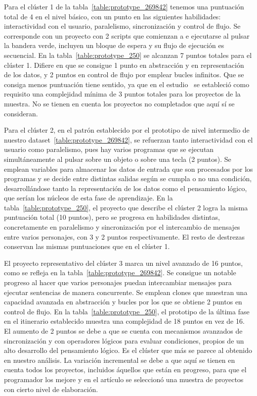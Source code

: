 \documentclass[a4paper, 12pt]{book}
\begin{document}
Para el clúster 1 de la tabla~\ref{table:prototype_269842} tenemos una puntuación total de 4 en el nivel básico, con un punto en las siguientes habilidades: interactividad con el usuario, paralelismo, sincronización y control de flujo. Se corresponde con un proyecto con 2 scripts que comienzan a e ejecutarse al pulsar la bandera verde, incluyen un bloque de espera y su flujo de ejecución es secuencial. En la tabla~\ref{table:prototype_250} se alcanzan 7 puntos totales para el clúster 1. Difiere en que se consigue 1 punto en abstracción y en representación de los datos, y 2 puntos en control de flujo por emplear bucles infinitos. Que se consiga menos puntuación tiene sentido, ya que en el estudio~\cite{moreno17:_paths} se estableció como requisito una complejidad mínima de 3 puntos totales para los proyectos de la muestra. No se tienen en cuenta los proyectos no completados que aquí sí se consideran.

Para el clúster 2, en el patrón establecido por el prototipo de nivel intermedio de nuestro dataset~\ref{table:prototype_269842}, se refuerzan tanto interactividad con el usuario como paralelismo, pues hay varios programas que se ejecutan simultáneamente al pulsar sobre un objeto o sobre una tecla (2 puntos). Se emplean variables para almacenar los datos de entrada que son procesados por los programas y se decide entre distintas salidas según se cumpla o no una condición, desarrollándose tanto la representación de los datos como el pensamiento lógico, que serían los núcleos de esta fase de aprendizaje.
En la tabla~\ref{table:prototype_250}, el proyecto que describe el clúster 2 logra la misma puntuación total (10 puntos), pero se progresa en habilidades distintas, concretamente en paralelismo y sincronización por el intercambio de mensajes entre varios personajes, con 3 y 2 puntos respectivamente. El resto de destrezas conservan las mismas puntuaciones que en el clúster 1.

El proyecto representativo del clúster 3 marca un nivel avanzado de 16 puntos, como se refleja en la tabla~\ref{table:prototype_269842}. Se consigue un notable progreso al hacer que varios personajes puedan intercambiar mensajes para ejecutar sentencias de manera concurrente. Se emplean clones que muestran una capacidad avanzada en abstracción y bucles por los que se obtiene 2 puntos en control de flujo. En la tabla~\ref{table:prototype_250}, el prototipo de la última fase en el itinerario establecido muestra una complejidad de 18 puntos en vez de 16. El aumento de 2 puntos se debe a que se cuenta con mecanismos avanzados de sincronización y con operadores lógicos para evaluar condiciones, propios de un alto desarrollo del pensamiento lógico. Es el clúster que más se parece al obtenido en nuestro análisis. La variación incremental se debe a que aquí se tienen en cuenta todos los proyectos, incluidos áquellos que están en progreso, para que el programador los mejore y en el artículo se seleccionó una muestra de proyectos con cierto nivel de elaboración.
\end{document}
